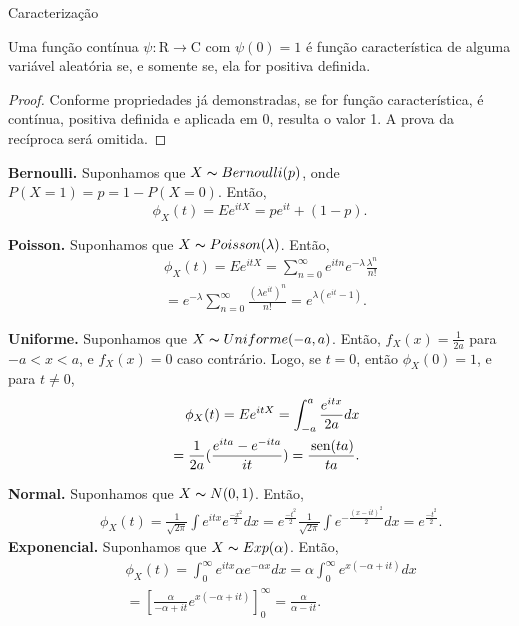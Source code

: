 \begin{frame}{Caracterização}

\begin{teo}
Uma função contínua $\psi: \mathrm{R}\rightarrow \mathrm{C}$ com $\psi(0)=1$ é função característica de alguma variável aleatória
se, e somente se, ela for positiva definida.
\end{teo}

\begin{proof}
Conforme propriedades já demonstradas, se for função característica, é contínua, positiva definida e aplicada em 0, resulta o valor 1. A prova da recíproca será omitida.
\end{proof}

\begin{exem}
{\bf Bernoulli.} Suponhamos que $X\thicksim Bernoulli(p)$, onde $P(X=1)=p=1-P(X=0)$.
Então,
$$\phi_X(t)=Ee^{itX}=pe^{it}+(1-p).$$

{\bf Poisson.} Suponhamos que $X\thicksim Poisson(\lambda)$.
Então,
\begin{eqnarray}
& & \phi_X(t)=Ee^{itX}=\sum_{n=0}^{\infty}e^{itn}e^{-\lambda}\frac{\lambda^n}{n!}\nonumber \\
& & =e^{-\lambda}\sum_{n=0}^{\infty}\frac{(\lambda e^{it})^n}{n!}=e^{\lambda(e^{it}-1)}.\nonumber
\end{eqnarray}

\end{exem}
\end{frame}


\begin{frame}

\begin{exem}

{\bf Uniforme.} Suponhamos que $X\thicksim Uniforme(-a,a)$.
Então, $f_X(x)=\frac{1}{2a}$ para $-a<x<a$, e $f_X(x)=0$ caso
contrário. Logo, se $t=0$, então $\phi_X(0)=1$, e para $t\ne 0$,
\begin{eqnarray}
& & \phi_X(t)=Ee^{itX}=\int_{-a}^{a}\frac{e^{itx}}{2a}dx\nonumber \\ & & =\frac{1}{2a}(\frac{e^{ita}-e^{-ita}}{it})=\frac{\mbox{\,sen}(ta)}{ta}.\nonumber
\end{eqnarray}

{\bf Normal.} Suponhamos que $X\thicksim N(0,1)$.
Então,
\begin{eqnarray}
& & \phi_X(t)=\frac{1}{\sqrt{2\pi}}\int e^{itx}e^{\frac{-x^2}{2}}dx=e^{\frac{-t^2}{2}}\frac{1}{\sqrt{2\pi}}\int e^{-\frac{(x-it)^2}{2}}dx=e^{\frac{-t^2}{2}}.\nonumber
\end{eqnarray}
{\bf Exponencial.} Suponhamos que $X\thicksim Exp(\alpha)$.
Então,
\begin{eqnarray}
& & \phi_X(t)=\int_{0}^{\infty} e^{itx}\alpha e^{-\alpha x}dx=\alpha \int_{0}^{\infty} e^{x(-\alpha +it)}dx \nonumber\\
& & =[\frac{\alpha}{-\alpha+it}e^{x(-\alpha +it)}]_{0}^{\infty}=\frac{\alpha}{\alpha-it}.
\nonumber
\end{eqnarray}
\end{exem}
\end{frame}


